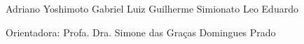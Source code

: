 \begin{folhaderosto}
	\begin{center}		
		
		\vspace*{\fill}\vspace*{\fill}
		\begin{center}
			\ABNTEXchapterfont\bfseries\Large\imprimirtitulo
		\end{center}
		\vspace*{\fill}
		
		\hspace{.45\textwidth}
		\begin{minipage}{.5\textwidth}
			\SingleSpacing
			\imprimirpreambulo
		\end{minipage}%
		
		\vspace*{1cm}
		\begin{flushright}
			\noindent Adriano Yoshimoto
			\linebreak
			\noindent Gabriel Luiz
			\linebreak
			\noindent Guilherme Simionato
			\linebreak
			\noindent Leo Eduardo
		\end{flushright}
		\vspace*{1cm}
		\begin{flushright}
			\noindent Orientadora: Profa. Dra. Simone das Graças Domingues Prado
		\end{flushright}
		\vspace*{1cm}
				
				
		{\large\imprimirlocal}
		\par
		{\large\imprimirdata}
		\vspace*{1cm}
		
	\end{center}
\end{folhaderosto}